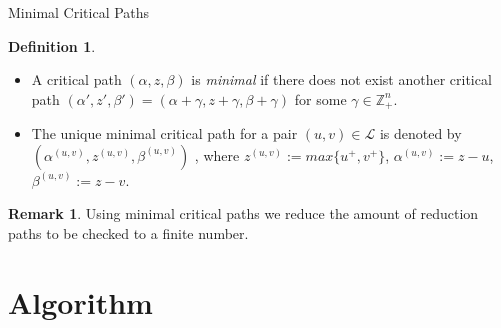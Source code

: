 \documentclass[9pt]{beamer}
\newcommand\Z{\mathbb{Z}}
\theoremstyle{definition}
\newtheorem{remark}{Remark}
\newtheorem{defn}{Definition}
\begin{document}
\begin{frame}[fragile]{Minimal Critical Paths}
  \begin{defn}
    \begin{itemize}
    \item A critical path $(\alpha, z, \beta)$ is \emph{minimal} if there does not
      exist another critical path $(\alpha', z', \beta') = (\alpha + \gamma, z + \gamma, \beta + \gamma)$
      for some $\gamma \in \Z^n_+$.
    \item The unique minimal critical path for a pair $(u, v) \in \mathcal{L}$ is denoted by
      $(\alpha^{(u, v)}, z^{(u,v)}, \beta^{(u,v)})$ , where $z^{(u, v)} := max\{u^+, v^+\}$,
      $\alpha^{(u, v)} := z - u$,       $\beta^{(u, v)} := z - v$.
    \end{itemize}
  \end{defn}
  \begin{remark}
    Using minimal critical paths we reduce the amount of reduction paths to be checked to a finite number.
  \end{remark}
\end{frame}

\section{Algorithm}
\end{document}
